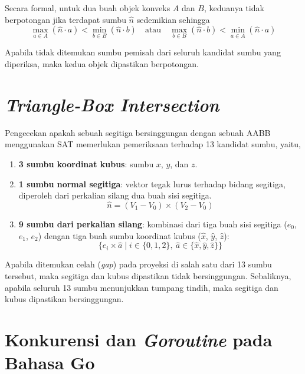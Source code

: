 Secara formal, untuk dua buah objek konveks $A$ dan $B$, keduanya tidak
berpotongan jika terdapat sumbu $\hat{n}$ sedemikian sehingga
\begin{equation}
    \max_{a \in A}(\hat{n} \cdot a) < \min_{b \in B}(\hat{n} \cdot b)
    \quad \text{atau} \quad
    \max_{b \in B}(\hat{n} \cdot b) < \min_{a \in A}(\hat{n} \cdot a)
\end{equation}

Apabila tidak ditemukan sumbu pemisah dari seluruh kandidat sumbu yang diperiksa,
maka kedua objek dipastikan berpotongan.

\section{\textit{Triangle-Box Intersection}}

Pengecekan apakah sebuah segitiga bersinggungan dengan sebuah AABB menggunakan
SAT memerlukan pemeriksaan terhadap 13 kandidat sumbu, yaitu,

\begin{enumerate}
    \item \textbf{3 sumbu koordinat kubus}: sumbu $x$, $y$, dan $z$.

    \item \textbf{1 sumbu normal segitiga}: vektor tegak lurus terhadap bidang
          segitiga, diperoleh dari perkalian silang dua buah sisi segitiga.
          \begin{equation}
              \hat{n} = (V_1 - V_0) \times (V_2 - V_0)
          \end{equation}

    \item \textbf{9 sumbu dari perkalian silang}: kombinasi dari tiga buah sisi
          segitiga ($e_0$, $e_1$, $e_2$) dengan tiga buah sumbu koordinat kubus
          ($\hat{x}$, $\hat{y}$, $\hat{z}$):
          \begin{equation}
              \{e_i \times \hat{a} \mid i \in \{0, 1, 2\},\ \hat{a} \in \{\hat{x}, \hat{y}, \hat{z}\}\}
          \end{equation}
\end{enumerate}

Apabila ditemukan celah (\textit{gap}) pada proyeksi di salah satu dari 13 sumbu
tersebut, maka segitiga dan kubus dipastikan tidak bersinggungan. Sebaliknya,
apabila seluruh 13 sumbu menunjukkan tumpang tindih, maka segitiga dan kubus
dipastikan bersinggungan.

\section{Konkurensi dan \textit{Goroutine} pada Bahasa Go}

